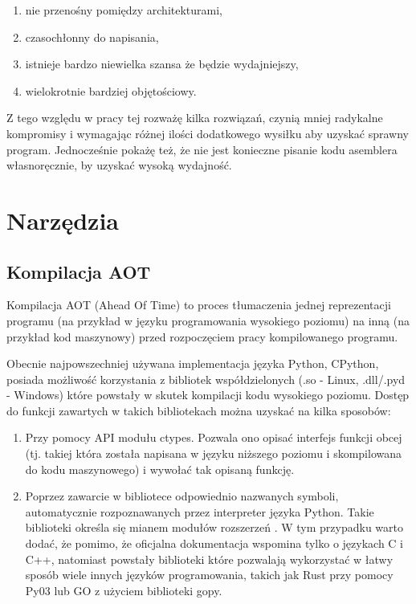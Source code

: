 \documentclass[11pt, a4paper]{article}
\begin{document}
\begin{sloppypar}
    \begin{enumerate}
      \item nie przenośny pomiędzy architekturami,

      \item czasochłonny do napisania,

      \item istnieje bardzo niewielka szansa że będzie wydajniejszy,

      \item wielokrotnie bardziej objętościowy.
    \end{enumerate}

    Z tego względu w pracy tej rozważę kilka rozwiązań, czynią mniej radykalne
    kompromisy i wymagając różnej ilości dodatkowego wysiłku aby uzyskać sprawny program.
    Jednocześnie pokażę też, że nie jest konieczne pisanie kodu asemblera własnoręcznie,
    by uzyskać wysoką wydajność.

    \section{Narzędzia}
    \subsection{Kompilacja AOT}
    Kompilacja AOT (Ahead Of Time) to proces tłumaczenia jednej reprezentacji programu (na
    przykład w języku programowania wysokiego poziomu) na inną (na przykład kod
    maszynowy) przed rozpoczęciem pracy kompilowanego programu.

    Obecnie najpowszechniej używana implementacja języka Python, CPython, posiada możliwość
    korzystania z bibliotek współdzielonych (.so - Linux, .dll/.pyd - Windows) które powstały
    w skutek kompilacji kodu wysokiego poziomu. Dostęp do funkcji zawartych w takich
    bibliotekach można uzyskać na kilka sposobów:

    \begin{enumerate}
      \item Przy pomocy API modułu ctypes\cite{Python_ctypes}. Pozwala ono opisać interfejs
        funkcji obcej (tj. takiej która została napisana w języku niższego poziomu i skompilowana
        do kodu maszynowego) i wywołać tak opisaną funkcję.

      \item Poprzez zawarcie w bibliotece odpowiednio nazwanych symboli, automatycznie
        rozpoznawanych przez interpreter języka Python. Takie biblioteki określa się mianem
        modułów rozszerzeń \cite{Extending_Python_With_C_Cpp}. W tym przypadku warto
        dodać, że pomimo, że oficjalna dokumentacja wspomina tylko o językach C i C++, natomiast
        powstały biblioteki które pozwalają wykorzystać w łatwy sposób wiele innych języków
        programowania, takich jak Rust przy pomocy Py03\cite{PyO3} lub GO z użyciem biblioteki
        gopy\cite{gopy}.


\end{enumerate}
\end{sloppypar}
\end{document}
